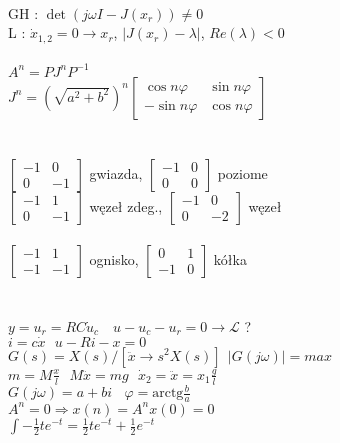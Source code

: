 \documentclass[a4paper,10pt]{article}
\begin{document}
\\
GH : $\det(j\omega I-J(x_r)) \neq 0$\\
L : $\dot{x}_{1,2}=0 \rightarrow x_r$, $|J(x_r)-\lambda|$, $Re(\lambda)<0$\\ 
\\
$A^n=PJ^nP^{-1}$\\
$J^n=(\sqrt{a^2+b^2})^n \left[ \begin{array}{cc}     \cos n\varphi&\sin n \varphi\\-\sin n \varphi&\cos n \varphi    \end{array}\right]$\\
\\\\
$\left[\begin{array}{cc}-1&0\\0&-1\end{array}\right]$ gwiazda, $\left[\begin{array}{cc}-1&0\\0&0\end{array}\right]$ poziome\\
$\left[\begin{array}{cc}-1&1\\0&-1\end{array}\right]$ węzeł zdeg., $\left[\begin{array}{cc}-1&0\\0&-2\end{array}\right]$ węzeł\\\\
$\left[\begin{array}{cc}-1&1\\-1&-1\end{array}\right]$ ognisko, $\left[\begin{array}{cc}0&1\\-1&0\end{array}\right]$ kółka\\
\\\\
$y=u_r=RC\dot{u}_c$
$\ \ \ u-u_c-u_r=0 \rightarrow \mathcal{L}$ ?\\
$i=c\dot{x} \ \ \ u-Ri-x=0$\\
$G(s)=X(s)/[\ddot{x}\rightarrow s^2X(s)] \ \ |G(j\omega)|=max$\\
$m=M\frac xl \ \ \ M\ddot{x}=mg \ \ \ \dot{x}_2=\ddot{x}=x_1\frac gl$\\
$G(j\omega)=a+bi \ \ \ \ \varphi=\text{arctg}\frac ba$\\
$A^n=0 \Rightarrow x(n)=A^nx(0)=0$\\
$\int -\frac12te^{-t}=\frac12te^{-t}+\frac12e^{-t}$
\end{document}
